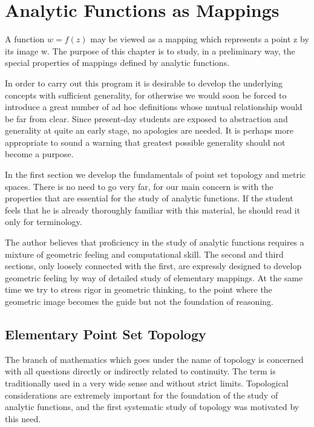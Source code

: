 \chapter{Analytic Functions as Mappings}\label{chap:3}

A function $w = f(z)$ may be viewed as a mapping which represents a point z by its image w. The purpose of this chapter is to study, in a preliminary way, the special properties of mappings defined by analytic functions.

In order to carry out this program it is desirable to develop the underlying concepts with sufficient generality, for otherwise we would soon be forced to introduce a great number of ad hoc definitions whose mutual relationship would be far from clear. Since present-day students are exposed to abstraction and generality at quite an early stage, no apologies are needed. It is perhaps more appropriate to sound a warning that greatest possible generality should not become a purpose.

In the first section we develop the fundamentals of point set topology and metric spaces. There is no need to go very far, for our main concern is with the properties that are essential for the study of analytic functions. If the student feels that he is already thoroughly familiar with this material, he should read it only for terminology.

The author believes that proficiency in the study of analytic functions requires a mixture of geometric feeling and computational skill. The second and third sections, only loosely connected with the first, are expressly designed to develop geometric feeling by way of detailed study of elementary mappings. At the same time we try to stress rigor in geometric thinking, to the point where the geometric image becomes the guide but not the foundation of reasoning.


\setcounter{section}{0}\section{Elementary Point Set Topology}\label{sec:3.1}
The branch of mathematics which goes under the name of topology is concerned with all questions directly or indirectly related to continuity. The term is traditionally used in a very wide sense and without strict limits. Topological considerations are extremely important for the foundation of the study of analytic functions, and the first systematic study of topology was motivated by this need.

